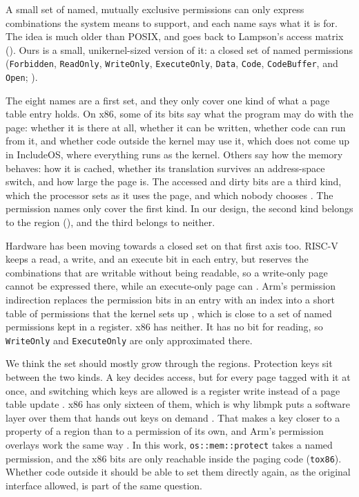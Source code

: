 \documentclass[12pt]{report}
\newcommand{\fullref}[1]{\Cref{#1}}
\renewcommand{\_}{\origunderscore\allowbreak}
\begin{document}
A small set of named, mutually exclusive permissions can only express combinations the system means to support, and each name says what it is for. The idea is much older than POSIX, and goes back to Lampson's access matrix (\fullref{sec:capability-protection}). Ours is a small, unikernel-sized version of it: a closed set of named permissions (\texttt{Forbidden}, \texttt{ReadOnly}, \texttt{WriteOnly}, \texttt{ExecuteOnly}, \texttt{Data}, \texttt{Code}, \texttt{CodeBuffer}, and \texttt{Open}; ).

The eight names are a first set, and they only cover one kind of what a page table entry holds. On x86, some of its bits say what the program may do with the page: whether it is there at all, whether it can be written, whether code can run from it, and whether code outside the kernel may use it, which does not come up in IncludeOS, where everything runs as the kernel. Others say how the memory behaves: how it is cached, whether its translation survives an address-space switch, and how large the page is. The accessed and dirty bits are a third kind, which the processor sets as it uses the page, and which nobody chooses \cite[Vol.~3A, Ch.~4]{intel-sdm}. The permission names only cover the first kind. In our design, the second kind belongs to the region (\fullref{sec:region-attributes}), and the third belongs to neither.

Hardware has been moving towards a closed set on that first axis too. RISC-V keeps a read, a write, and an execute bit in each entry, but reserves the combinations that are writable without being readable, so a write-only page cannot be expressed there, while an execute-only page can \cite{riscv-priv}. Arm's permission indirection replaces the permission bits in an entry with an index into a short table of permissions that the kernel sets up \cite{arm-arm}, which is close to a set of named permissions kept in a register. x86 has neither. It has no bit for reading, so \texttt{WriteOnly} and \texttt{ExecuteOnly} are only approximated there.

We think the set should mostly grow through the regions. Protection keys sit between the two kinds. A key decides access, but for every page tagged with it at once, and switching which keys are allowed is a register write instead of a page table update \cite[Vol.~3A, Ch.~4]{intel-sdm}. x86 has only sixteen of them, which is why libmpk puts a software layer over them that hands out keys on demand \cite{park2019libmpk}. That makes a key closer to a property of a region than to a permission of its own, and Arm's permission overlays work the same way \cite{arm-arm}. In this work, \texttt{os::mem::protect} takes a named permission, and the x86 bits are only reachable inside the paging code (\texttt{to\_x86}). Whether code outside it should be able to set them directly again, as the original interface allowed, is part of the same question.
\end{document}
